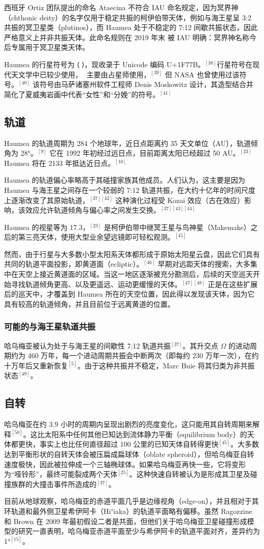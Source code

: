 西班牙 Ortiz 团队提出的命名 Ataecina 不符合 IAU 命名规定，因为冥界神（chthonic deity）的名字仅用于稳定共振的柯伊伯带天体，例如与海王星呈 3:2 共振的冥卫星类（plutinos），而 Haumea 处于不稳定的 7:12 间歇共振状态，因此严格意义上并非共振天体。此命名规则在 2019 年末 被 IAU 明确：冥界神名称今后专属用于冥卫星类天体。

Haumea 的行星符号为 ⟨🝻⟩，现收录于 Unicode 编码 U+1F77B。$^{[38]}$行星符号在现代天文学中已较少使用，🝻 主要由占星师使用，$^{[39]}$ 但 NASA 也曾使用过该符号。$^{[40]}$
该符号由马萨诸塞州软件工程师 Denis Moskowitz 设计，其造型结合并简化了夏威夷岩画中代表“女性”和“分娩”的符号。$^{[41]}$
\subsection{轨道}
Haumea 的轨道周期为 284 个地球年，近日点距离约 35 天文单位（AU），轨道倾角为 28°。$^{[9]}$ 它在 1992 年初经过远日点，目前距离太阳已经超过 50 AU。$^{[23]}$ Haumea 将在 2133 年抵达近日点。$^{[10]}$

Haumea 的轨道偏心率略高于其碰撞家族其他成员。人们认为，这主要是因为 Haumea 与海王星之间存在一个较弱的 7:12 轨道共振，在大约十亿年的时间尺度上逐渐改变了其原始轨道，$^{[37][42]}$ 这种演化过程受 Kozai 效应（古在效应）影响，该效应允许轨道倾角与偏心率之间发生交换。$^{[37][43][44]}$

Haumea 的视星等为 17.3，$^{[23]}$ 是柯伊伯带中继冥王星与鸟神星（Makemake）之后的第三亮天体，使用大型业余望远镜即可轻松观测。$^{[45]}$

然而，由于行星与大多数小型太阳系天体都形成于原始太阳星云盘，因此它们具有共同的轨道平面投影，即黄道面（ecliptic）。$^{[46]}$ 早期对远距天体的搜索，大多集中在天空上接近黄道面的区域。当这一地区逐渐被充分勘测后，后续的天空巡天开始寻找轨道倾角更高、以及更遥远、运动更缓慢的天体。$^{[47][48]}$ 正是在这些扩展后的巡天中，才覆盖到 Haumea 所在的天空位置，因此得以发现该天体，因为它具有较高的轨道倾角，并且目前位于远离黄道的位置。
\subsubsection{可能的与海王星轨道共振}
哈乌梅亚被认为处于与海王星的间歇性 7:12 轨道共振$^{[37]}$。其升交点 $\Omega$ 的进动周期约为 460 万年，每一个进动周期共振会中断两次（即每约 230 万年一次），在约十万年后又重新恢复$^{[5]}$。由于这种共振并不稳定，Marc Buie 将其归类为非共振状态$^{[49]}$。
\subsection{自转}
哈乌梅亚在约 3.9 小时的周期内呈现出剧烈的亮度变化，这只能用其自转周期来解释$^{[50]}$。这比太阳系中任何其他已知达到流体静力平衡（equilibrium body）的天体都更快，事实上也比任何直径超过 100 公里的已知天体自转得更快$^{[45]}$。大多数达到平衡形状的自转天体会被压扁成扁球体（oblate spheroid），但哈乌梅亚自转速度极快，因此被拉伸成一个三轴椭球体。如果哈乌梅亚再快一些，它将变形为“哑铃形”，最终可能裂成两个天体$^{[25]}$。这种快速自转被认为是形成其卫星及碰撞族群的大撞击事件所造成的$^{[37]}$。

目前从地球观察，哈乌梅亚的赤道平面几乎是边缘视角（edge-on），并且相对于其环轨道和最外侧卫星希伊阿卡（Hiʻiaka）的轨道平面略有偏移。虽然 Ragozzine 和 Brown 在 2009 年最初假设二者是共面，但他们关于哈乌梅亚卫星碰撞形成模型的研究一直表明，哈乌梅亚赤道平面至少与希伊阿卡的轨道平面对齐，差异约为 1°$^{[15]}$。

